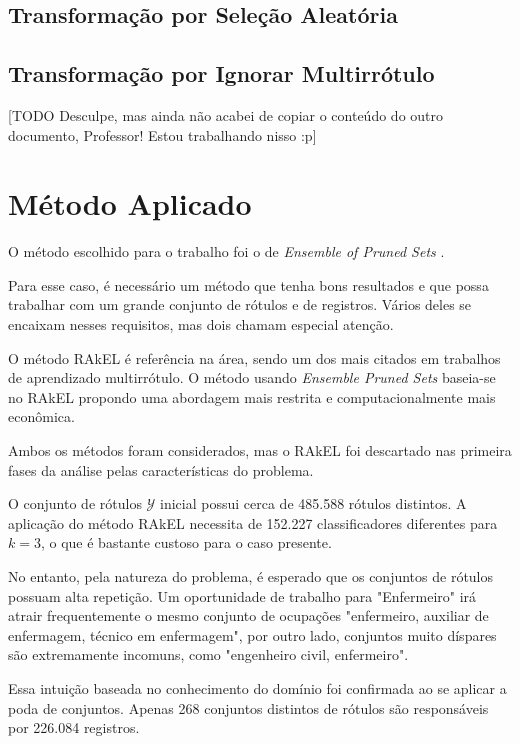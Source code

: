 \documentclass[runningheads,a4paper]{llncs}
\begin{document}
\subsection{Transformação por Seleção Aleatória}

\subsection{Transformação por Ignorar Multirrótulo}

[TODO Desculpe, mas ainda não acabei de copiar o conteúdo do outro documento, Professor! Estou trabalhando nisso :p]

\section{Método Aplicado} \label{sec:justificativa}

O método escolhido para o trabalho foi o de \textit{Ensemble of Pruned Sets} \cite{Read2008-bt}.

Para esse caso, é necessário um método que tenha bons resultados e que possa trabalhar com um grande conjunto de rótulos e de registros. Vários deles se encaixam nesses requisitos, mas dois chamam especial atenção.

O método RAkEL \cite{Tsoumakas2007-wm} é referência na área, sendo um dos mais citados em trabalhos de aprendizado multirrótulo. O método usando \textit{Ensemble Pruned Sets} baseia-se no RAkEL propondo uma abordagem mais restrita e computacionalmente mais econômica.

Ambos os métodos foram considerados, mas o RAkEL foi descartado nas primeira fases da análise pelas características do problema.

O conjunto de rótulos $\mathcal{Y}$ inicial possui cerca de 485.588 rótulos distintos. A aplicação do método RAkEL \cite{Tsoumakas2007-wm} necessita de 152.227 classificadores diferentes para $k=3$, o que é bastante custoso para o caso presente.

No entanto, pela natureza do problema, é esperado que os conjuntos de rótulos possuam alta repetição. Um oportunidade de trabalho para "Enfermeiro" irá atrair frequentemente o mesmo conjunto de ocupações "enfermeiro, auxiliar de enfermagem, técnico em enfermagem", por outro lado, conjuntos muito díspares são extremamente incomuns, como "engenheiro civil, enfermeiro".

Essa intuição baseada no conhecimento do domínio foi confirmada ao se aplicar a poda de conjuntos. Apenas 268 conjuntos distintos de rótulos são responsáveis por 226.084 registros.
\end{document}
